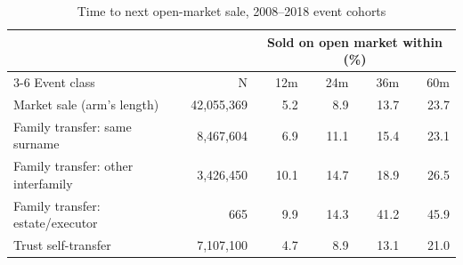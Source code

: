 \begin{table}[!t]\centering
\caption{Time to next open-market sale, 2008--2018 event cohorts}
\label{tab:hazard}
{\small
\begin{tabular}{lrrrrr}
\toprule
 & & \multicolumn{4}{c}{Sold on open market within (\%)} \\
\cmidrule(lr){3-6}
Event class & N & 12m & 24m & 36m & 60m \\
\midrule
Market sale (arm's length) & 42,055,369 & 5.2 & 8.9 & 13.7 & 23.7 \\
Family transfer: same surname & 8,467,604 & 6.9 & 11.1 & 15.4 & 23.1 \\
Family transfer: other interfamily & 3,426,450 & 10.1 & 14.7 & 18.9 & 26.5 \\
Family transfer: estate/executor & 665 & 9.9 & 14.3 & 41.2 & 45.9 \\
Trust self-transfer & 7,107,100 & 4.7 & 8.9 & 13.1 & 21.0 \\
\bottomrule
\end{tabular}}
\begin{minipage}{0.9\textwidth}\end{minipage}
\end{table}
